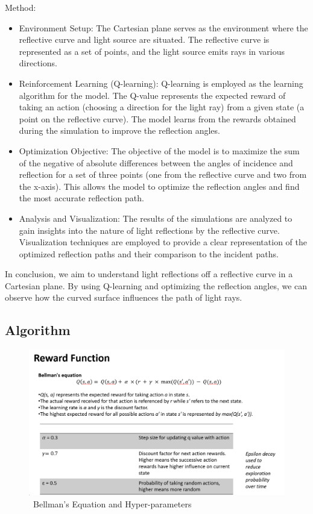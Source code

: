 \documentclass[12pt,a4paper,twoside]{report}
\begin{document}
Method:

\begin{itemize}


\item Environment Setup: The Cartesian plane serves as the environment where the reflective curve and light source are situated. The reflective curve is represented as a set of points, and the light source emits rays in various directions.

\item Reinforcement Learning (Q-learning): Q-learning is employed as the learning algorithm for the model. The Q-value represents the expected reward of taking an action (choosing a direction for the light ray) from a given state (a point on the reflective curve). The model learns from the rewards obtained during the simulation to improve the reflection angles.

\item Optimization Objective: The objective of the model is to maximize the sum of the negative of absolute differences between the angles of incidence and reflection for a set of three points (one from the reflective curve and two from the x-axis). This allows the model to optimize the reflection angles and find the most accurate reflection path.

\item Analysis and Visualization: The results of the simulations are analyzed to gain insights into the nature of light reflections by the reflective curve. Visualization techniques are employed to provide a clear representation of the optimized reflection paths and their comparison to the incident paths.\\
\end{itemize}

In conclusion, we aim to understand light reflections off a reflective curve in a Cartesian plane. By using Q-learning and optimizing the reflection angles, we can observe how the curved surface influences the path of light rays.

\subsection{Algorithm}

\begin{figure}
	\centering
	\includegraphics[width=1\linewidth]{rewardfunc}
	\caption{~Bellman's Equation and Hyper-parameters}
	\label{fig:rewardfunc}
\end{figure}
\end{document}
